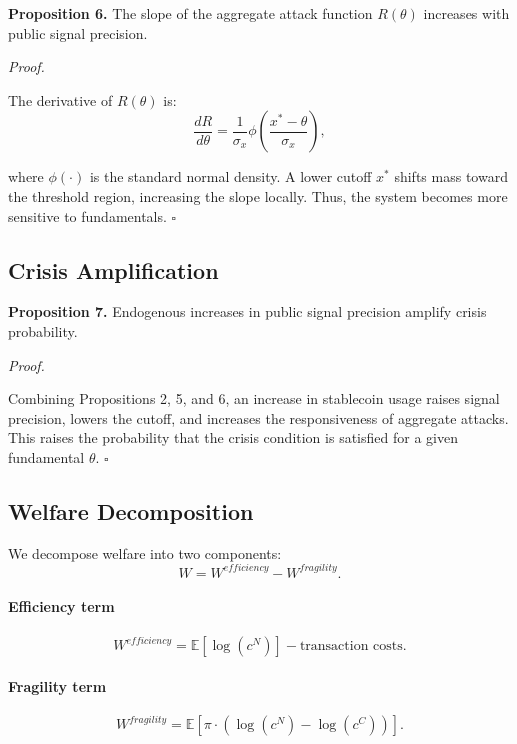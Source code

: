 \textbf{Proposition 6.} The slope of the aggregate attack function $R(\theta)$ increases with public signal precision.

\textit{Proof.}

The derivative of $R(\theta)$ is:
\begin{equation}
\frac{dR}{d\theta} = \frac{1}{\sigma_x} \phi\left(\frac{x^* - \theta}{\sigma_x}\right),
\end{equation}

where $\phi(\cdot)$ is the standard normal density. A lower cutoff $x^*$ shifts mass toward the threshold region, increasing the slope locally. Thus, the system becomes more sensitive to fundamentals. \hfill $\square$

\subsection{Crisis Amplification}

\textbf{Proposition 7.} Endogenous increases in public signal precision amplify crisis probability.

\textit{Proof.}

Combining Propositions 2, 5, and 6, an increase in stablecoin usage raises signal precision, lowers the cutoff, and increases the responsiveness of aggregate attacks. This raises the probability that the crisis condition is satisfied for a given fundamental $\theta$. \hfill $\square$

\subsection{Welfare Decomposition}

We decompose welfare into two components:
\begin{equation}
W = W^{efficiency} - W^{fragility}.
\end{equation}

\paragraph{Efficiency term}
\begin{equation}
W^{efficiency} = \mathbb{E}[\log(c^N)] - \text{transaction costs}.
\end{equation}

\paragraph{Fragility term}
\begin{equation}
W^{fragility} = \mathbb{E}[\pi \cdot (\log(c^N) - \log(c^C))].
\end{equation}

